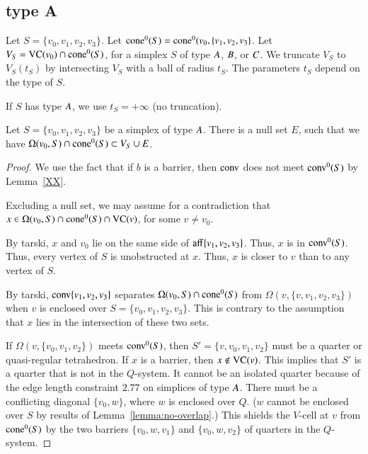\subsection{type A}%
    \label{sec:separation}

Let $S = \{v_0,v_1,v_2,v_3\}$.
Let ${\operatorname{cone}}^0(S) = {\operatorname{cone}}^0(v_0,\{v_1,v_2,v_3\}$.
Let $V_S = {\operatorname{VC}}(v_0)\cap {\operatorname{cone}}^0(S)$, for a simplex $S$ of type $A$,
$B$, or $C$. 
We truncate $V_S$ to $V_S(t_S)$ by intersecting
$V_S$ with a ball of radius $t_S$.  The parameters $t_S$ depend on
the type of $S$.

If $S$ has type $A$, we use $t_S=+\infty$ (no truncation).

\begin{lemma} Let $S=\{v_0,v_1,v_2,v_3\}$ be a simplex of type $A$.
There is a null set $E$, such that
we have  $ \Omega(v_0,S) \cap {\operatorname{cone}}^0(S) \subset V_S \cup E$.
\end{lemma}

\begin{proof} 
We use the fact that if $b$ is a barrier, then ${\operatorname{conv}}$ does
not meet ${\operatorname{conv}}^0(S)$ by Lemma~\ref{XX}.  


Excluding a null set, we may assume 
for a contradiction that
$x\in \Omega(v_0,S) \cap {\operatorname{cone}}^0(S) \cap {\operatorname{VC}}(v)$,
for some $v\ne v_0$.  

By tarski, $x$ and $v_0$ lie on the
same side of ${\operatorname{aff}}\{v_1,v_2,v_3\}$.  Thus, $x$ is in
${\operatorname{conv}}^0(S)$.  
Thus, every vertex of $S$ is unobstructed at $x$.  Thus, $x$
is closer to $v$ than to any vertex of $S$.

By tarski, ${\operatorname{conv}}\{v_1,v_2,v_3\}$ 
separates
$\Omega(v_0,S)\cap {\operatorname{cone}}^0(S)$ from $\Omega(v,\{v,v_1,v_2,v_3\})$ when
$v$ is enclosed over $S=\{v_0,v_1,v_2,v_3\}$.  This is contrary
to the assumption that $x$ lies in the intersection of these
two sets.

If $\Omega(v,\{v_0,v_1,v_2\})$ meets ${\operatorname{conv}}^0(S)$, then
$S'=\{v,v_0,v_1,v_2\}$ must be a quarter or quasi-regular tetrahedron.
If $x$ is a barrier, then $x\not\in{\operatorname{VC}}(v)$.  This implies
that $S'$ is a quarter that is not in the $Q$-system.
It
cannot be an isolated quarter because of the edge length
constraint $2.77$ on simplices of type $A$.
There must be a
conflicting diagonal $\{v_0,w\}$, where $w$ is enclosed over $Q$. ($w$
cannot be enclosed over $S$ by results of
Lemma~\ref{lemma:no-overlap}.) This shields the $V$-cell at $v$
from ${\operatorname{cone}}^0(S)$ by the two barriers $\{v_0,w,v_1\}$ and $\{v_0,w,v_2\}$ of
quarters in the $Q$-system.
\end{proof}

